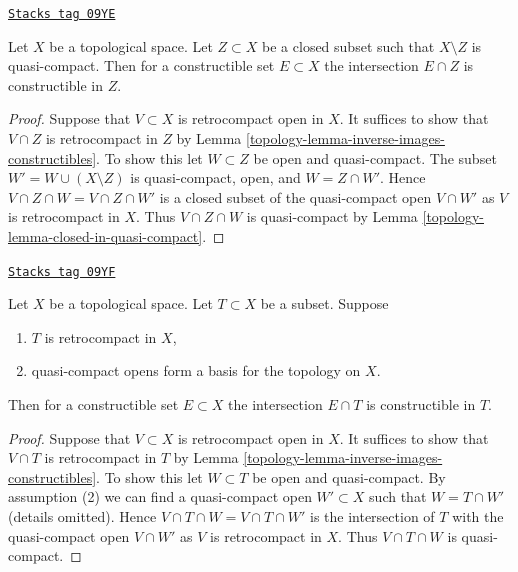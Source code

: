 \begin{lemma}
\label{topology-lemma-intersect-constructible-with-closed}
\href{https://stacks.math.columbia.edu/tag/09YE}{\texttt{Stacks tag 09YE}}

Let $X$ be a topological space. Let $Z \subset X$ be a closed
subset such that $X \setminus Z$ is quasi-compact.
Then for a constructible set $E \subset X$ the intersection
$E \cap Z$ is constructible in $Z$.
\end{lemma}

\begin{proof}

Suppose that $V \subset X$ is retrocompact open in $X$.
It suffices to show that $V \cap Z$ is retrocompact in $Z$
by Lemma \ref{topology-lemma-inverse-images-constructibles}. To show this
let $W \subset Z$ be open and quasi-compact. The subset
$W' = W \cup (X \setminus Z)$ is quasi-compact, open, and $W = Z \cap W'$.
Hence $V \cap Z \cap W = V \cap Z \cap W'$
is a closed subset of the quasi-compact open $V \cap W'$
as $V$ is retrocompact in $X$. Thus $V \cap Z \cap W$ is quasi-compact
by Lemma \ref{topology-lemma-closed-in-quasi-compact}.
\end{proof}

\begin{lemma}
\label{topology-lemma-intersect-constructible-with-retrocompact}
\href{https://stacks.math.columbia.edu/tag/09YF}{\texttt{Stacks tag 09YF}}

Let $X$ be a topological space. Let $T \subset X$ be a subset. Suppose
\begin{enumerate}
\item $T$ is retrocompact in $X$,
\item quasi-compact opens form a basis for the topology on $X$.
\end{enumerate}
Then for a constructible set $E \subset X$ the intersection $E \cap T$ is
constructible in $T$.
\end{lemma}

\begin{proof}

Suppose that $V \subset X$ is retrocompact open in $X$.
It suffices to show that $V \cap T$ is retrocompact in $T$
by Lemma \ref{topology-lemma-inverse-images-constructibles}. To show this
let $W \subset T$ be open and quasi-compact. By assumption (2)
we can find a quasi-compact open $W' \subset X$
such that $W = T \cap W'$ (details omitted).
Hence $V \cap T \cap W = V \cap T \cap W'$
is the intersection of $T$ with  the quasi-compact open $V \cap W'$
as $V$ is retrocompact in $X$. Thus $V \cap T \cap W$ is quasi-compact.
\end{proof}

